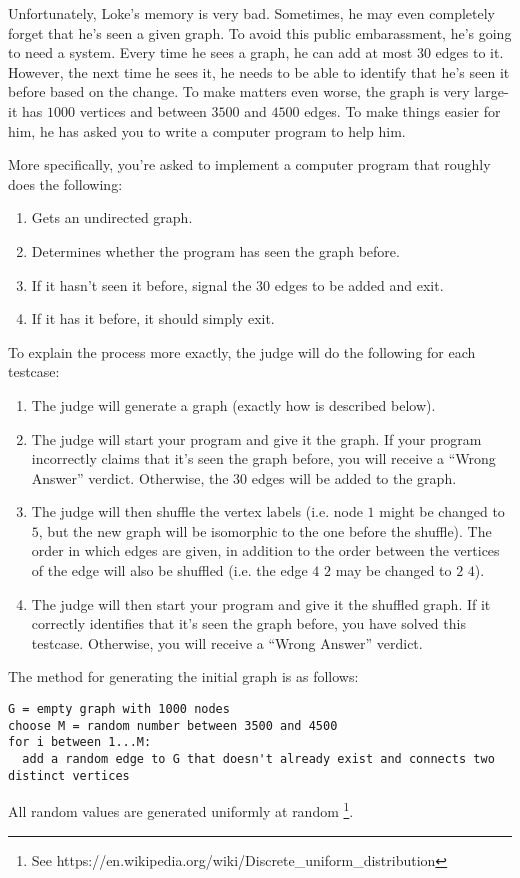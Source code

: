 \noindent
Unfortunately, Loke's memory is very bad. Sometimes, he may even completely forget that he's seen a given graph. 
To avoid this public embarassment, he's going to need a system. Every time he sees a graph, he can add at most $30$
edges to it. However, the next time he sees it, he needs to be able to identify that he's seen it before based on the
change. To make matters even worse, the graph is very large- it has $1000$ vertices and between $3500$ and $4500$ edges.
To make things easier for him, he has asked you to write a computer program to help him.

More specifically, you're asked to implement a computer program that roughly does the following:
\begin{enumerate}
  \item Gets an undirected graph.
  \item Determines whether the program has seen the graph before.
  \item If it hasn't seen it before, signal the $30$ edges to be added and exit.
  \item If it has it before, it should simply exit.
\end{enumerate}
To explain the process more exactly, the judge will do the following for each testcase:
\begin{enumerate}
  \item The judge will generate a graph (exactly how is described below).
  \item The judge will start your program and give it the graph. If your program incorrectly claims that it's seen the graph before,
  you will receive a ``Wrong Answer'' verdict. Otherwise, the $30$ edges will be added to the graph.
  \item The judge will then shuffle the vertex labels (i.e. node $1$ might be changed to $5$, but the new
  graph will be isomorphic to the one before the shuffle). The order in which edges are given, in addition to the
  order between the vertices of the edge will also be shuffled (i.e. the edge $4$ $2$ may be changed to $2$ $4$).
  \item The judge will then start your program and give it the shuffled graph. If it correctly identifies that
  it's seen the graph before, you have solved this testcase. Otherwise, you will receive a ``Wrong Answer'' verdict.
\end{enumerate}


The method for generating the initial graph is as follows:
\begin{verbatim}
G = empty graph with 1000 nodes
choose M = random number between 3500 and 4500
for i between 1...M:
  add a random edge to G that doesn't already exist and connects two distinct vertices
\end{verbatim}
All random values are generated uniformly at random \footnote{See https://en.wikipedia.org/wiki/Discrete\_uniform\_distribution}.

